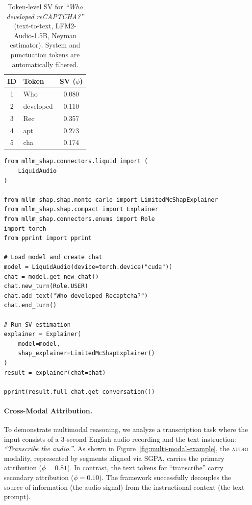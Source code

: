 \documentclass[11pt]{article}
\begin{document}
\begin{table}[ht]
\centering
\small
\caption{Token-level SV for \emph{``Who developed reCAPTCHA?''} (text-to-text, LFM2-Audio-1.5B, Neyman estimator). System and punctuation tokens are automatically filtered.}
\begin{tabular}{clc}
\toprule
\textbf{ID} & \textbf{Token} & \textbf{SV ($\phi$)} \\
\midrule
1 & Who       & 0.080 \\
2 & developed & 0.110 \\
3 & Rec       & 0.357 \\
4 & apt       & 0.273 \\
5 & cha       & 0.174 \\
\bottomrule
\end{tabular}
\label{tab:recaptcha}
\end{table}

\begin{lstlisting}[caption={Minimal SV attribution with \texttt{mllm-shap}.},label=lst:example,float=t]
from mllm_shap.connectors.liquid import (
    LiquidAudio
)

from mllm_shap.shap.monte_carlo import LimitedMcShapExplainer
from mllm_shap.shap.compact import Explainer
from mllm_shap.connectors.enums import Role
import torch
from pprint import pprint

# Load model and create chat
model = LiquidAudio(device=torch.device("cuda"))
chat = model.get_new_chat()
chat.new_turn(Role.USER)
chat.add_text("Who developed Recaptcha?")
chat.end_turn()

# Run SV estimation
explainer = Explainer(
    model=model,
    shap_explainer=LimitedMcShapExplainer()
)
result = explainer(chat=chat)

pprint(result.full_chat.get_conversation())
\end{lstlisting}

\paragraph{Cross-Modal Attribution.}
To demonstrate multimodal reasoning, we analyze a transcription task where the input consists of a 3-second English audio recording and the text instruction: \emph{``Transcribe the audio.''}. As shown in Figure~\ref{fig:multi-modal-example}, the \textsc{audio} modality, represented by segments aligned via SGPA,  carries the primary attribution ($\phi{=}0.81$). In contrast, the text tokens for ``transcribe'' carry secondary attribution ($\phi{=}0.10$). The framework successfully decouples the source of information (the audio signal) from the instructional context (the text prompt).
\end{document}
